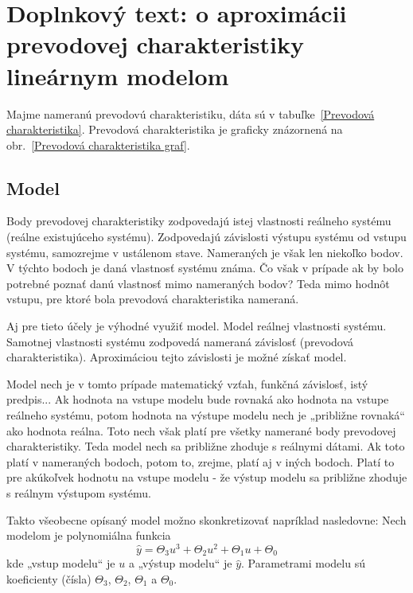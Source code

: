 \documentclass[a4paper, 10pt, ]{article}
\begin{document}
\clearpage



\section{Doplnkový text: o aproximácii prevodovej charakteristiky lineárnym modelom}




\noindent
Majme nameranú prevodovú charakteristiku, dáta sú v tabuľke~\ref{Prevodová charakteristika}. Prevodová charakteristika je graficky znázornená na obr.~\ref{Prevodová charakteristika graf}.







\subsection{Model}

Body prevodovej charakteristiky zodpovedajú istej vlastnosti reálneho systému (reálne existujúceho systému). Zodpovedajú závislosti výstupu systému od vstupu systému, samozrejme v ustálenom stave. Nameraných je však len niekoľko bodov. V týchto bodoch je daná vlastnosť systému známa. Čo však v prípade ak by bolo potrebné poznať danú vlastnosť mimo nameraných bodov? Teda mimo hodnôt vstupu, pre ktoré bola prevodová charakteristika nameraná.

Aj pre tieto účely je výhodné využiť model. Model reálnej vlastnosti systému. Samotnej vlastnosti systému zodpovedá nameraná závislosť (prevodová charakteristika). Aproximáciou tejto závislosti je možné získať model.

Model nech je v tomto prípade matematický vzťah, funkčná závislosť, istý predpis... Ak hodnota na vstupe modelu bude rovnaká ako hodnota na vstupe reálneho systému, potom hodnota na výstupe modelu nech je „približne rovnaká“ ako hodnota reálna. Toto nech však platí pre všetky namerané body prevodovej charakteristiky. Teda model nech sa približne zhoduje s reálnymi dátami. Ak toto platí v nameraných bodoch, potom to, zrejme, platí aj v iných bodoch. Platí to pre akúkoľvek hodnotu na vstupe modelu - že výstup modelu sa približne zhoduje s reálnym výstupom systému.



Takto všeobecne opísaný model možno skonkretizovať napríklad nasledovne: Nech modelom je polynomiálna funkcia
\begin{equation} \label{polyFcnDef}
    \hat y = \Theta_3 u^3 + \Theta_2 u^2 + \Theta_1 u + \Theta_0
\end{equation}
kde „vstup modelu“ je $u$ a „výstup modelu“ je $\hat y$. Parametrami modelu sú koeficienty (čísla) $\Theta_3$, $\Theta_2$, $\Theta_1$ a $\Theta_0$.
\end{document}
